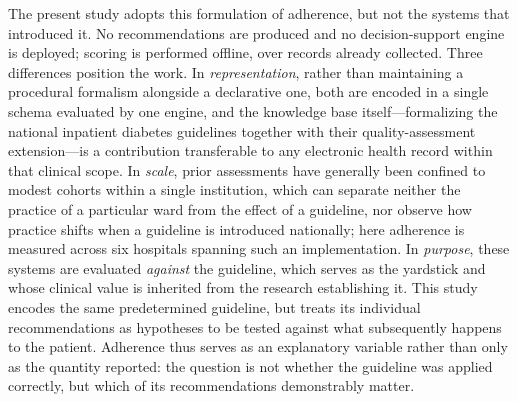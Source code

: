 The present study adopts this formulation of adherence, but not the systems
that introduced it. No recommendations are produced and no decision-support
engine is deployed; scoring is performed offline, over records already
collected. Three differences position the work. In \emph{representation},
rather than maintaining a procedural formalism alongside a declarative one,
both are encoded in a single schema evaluated by one engine, and the
knowledge base itself---formalizing the national inpatient diabetes
guidelines together with their quality-assessment extension---is a
contribution transferable to any electronic health record within that
clinical scope. In \emph{scale}, prior assessments have generally been
confined to modest cohorts within a single institution, which can separate
neither the practice of a particular ward from the effect of a guideline,
nor observe how practice shifts when a guideline is introduced nationally;
here adherence is measured across six hospitals spanning such an
implementation. In \emph{purpose}, these systems are evaluated \emph{against}
the guideline, which serves as the yardstick and whose clinical value is
inherited from the research establishing it. This study encodes the same
predetermined guideline, but treats its individual recommendations as
hypotheses to be tested against what subsequently happens to the patient.
Adherence thus serves as an explanatory variable rather than only as the
quantity reported: the question is not whether the guideline was applied
correctly, but which of its recommendations demonstrably matter.
